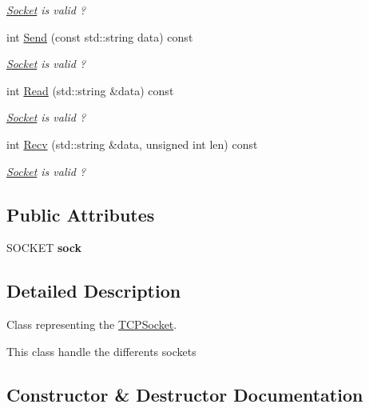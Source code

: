\begin{DoxyCompactItemize}
\begin{DoxyCompactList}\small\item\em \hyperlink{class_socket}{Socket} is valid ? \end{DoxyCompactList}\item 
int \hyperlink{class_t_c_p_socket_aaf5b33093a15e670da96eed106b953a0}{Send} (const std\+::string data) const
\begin{DoxyCompactList}\small\item\em \hyperlink{class_socket}{Socket} is valid ? \end{DoxyCompactList}\item 
int \hyperlink{class_t_c_p_socket_a45e9155a64fb9dca84aee4967a719aff}{Read} (std\+::string \&data) const
\begin{DoxyCompactList}\small\item\em \hyperlink{class_socket}{Socket} is valid ? \end{DoxyCompactList}\item 
int \hyperlink{class_t_c_p_socket_a120e18e534e4cabcd7a947302517b174}{Recv} (std\+::string \&data, unsigned int len) const
\begin{DoxyCompactList}\small\item\em \hyperlink{class_socket}{Socket} is valid ? \end{DoxyCompactList}\end{DoxyCompactItemize}
\subsection*{Public Attributes}
\begin{DoxyCompactItemize}
\item 
\mbox{\label{class_t_c_p_socket_a7e8163cb9b0647c15816d1d2a1d3deec}} 
S\+O\+C\+K\+ET {\bfseries sock}
\end{DoxyCompactItemize}


\subsection{Detailed Description}
Class representing the \hyperlink{class_t_c_p_socket}{T\+C\+P\+Socket}. 

This class handle the differents sockets 

\subsection{Constructor \& Destructor Documentation}
\mbox{\label{class_t_c_p_socket_af357e6923a0f8adbbb8e46fab4523991}} 
